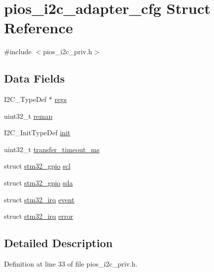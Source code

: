 \hypertarget{structpios__i2c__adapter__cfg}{\section{pios\-\_\-i2c\-\_\-adapter\-\_\-cfg \-Struct \-Reference}
\label{structpios__i2c__adapter__cfg}
}


{\ttfamily \#include $<$pios\-\_\-i2c\-\_\-priv.\-h$>$}

\subsection*{\-Data \-Fields}
\begin{DoxyCompactItemize}
\item 
\-I2\-C\-\_\-\-Type\-Def $\ast$ \hyperlink{structpios__i2c__adapter__cfg_af657d3f333ba35a0c78315381851f748}{regs}
\item 
uint32\-\_\-t \hyperlink{structpios__i2c__adapter__cfg_a64d54eb4eb6d9aa0111e3f677afc37ba}{remap}
\item 
\-I2\-C\-\_\-\-Init\-Type\-Def \hyperlink{structpios__i2c__adapter__cfg_a7c0f3d2e295cc0583245ad41d61e33fe}{init}
\item 
uint32\-\_\-t \hyperlink{structpios__i2c__adapter__cfg_a97b5a8ff68686286ba5f86dda188eb01}{transfer\-\_\-timeout\-\_\-ms}
\item 
struct \hyperlink{structstm32__gpio}{stm32\-\_\-gpio} \hyperlink{structpios__i2c__adapter__cfg_a900bd610a99f0518997e6e2564ef15c7}{scl}
\item 
struct \hyperlink{structstm32__gpio}{stm32\-\_\-gpio} \hyperlink{structpios__i2c__adapter__cfg_a429bb7d5f0918ade96becff15a633875}{sda}
\item 
struct \hyperlink{structstm32__irq}{stm32\-\_\-irq} \hyperlink{structpios__i2c__adapter__cfg_acdad71da492ab5d4582a5b03cd7d1ab2}{event}
\item 
struct \hyperlink{structstm32__irq}{stm32\-\_\-irq} \hyperlink{structpios__i2c__adapter__cfg_a5e418625b07806a90c8f5a55cc1165eb}{error}
\end{DoxyCompactItemize}


\subsection{\-Detailed \-Description}


\-Definition at line 33 of file pios\-\_\-i2c\-\_\-priv.\-h.



